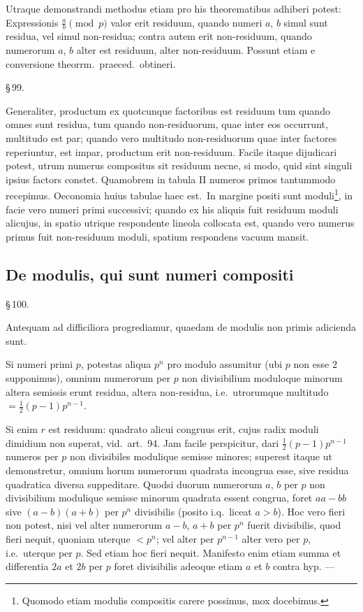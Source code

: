\documentclass[12pt,a4paper]{article}
\theoremstyle{plain}
\theoremstyle{definition}
\theoremstyle{remark}
\begin{document}
Utraque demonstrandi methodus etiam pro his theorematibus adhiberi potest: Expressionis $\frac{a}{b} \pmod{p}$ valor erit residuum, quando numeri $a$, $b$ simul sunt residua, vel simul non-residua; contra autem erit non-residuum, quando numerorum $a$, $b$ alter est residuum, alter non-residuum. Possunt etiam e conversione theorrm.\ praeced.\ obtineri.

\begin{center}\S\,99.\end{center}

Generaliter, productum ex quotcunque factoribus est residuum tum quando omnes sunt residua, tum quando non-residuorum, quae inter eos occurrunt, multitudo est par; quando vero multitudo non-residuorum quae inter factores reperiuntur, est impar, productum erit non-residuum. Facile itaque dijudicari potest, utrum numerus compositus sit residuum necne, si modo, quid sint singuli ipsius factors constet. Quamobrem in tabula II numeros primos tantummodo recepimus. Oeconomia huius tabulae haec est.\ In margine positi sunt moduli\footnote{Quomodo etiam modulis compositis carere possimus, mox docebimus.}, in facie vero numeri primi successivi; quando ex his aliquis fuit residuum moduli alicujus, in spatio utrique respondente lineola collocata est, quando vero numerus primus fuit non-residuum moduli, spatium respondens vacuum mansit.

\subsection*{De modulis, qui sunt numeri compositi}

\begin{center}\S\,100.\end{center}

Antequam ad difficiliora progrediamur, quaedam de modulis non primis adicienda sunt.

Si numeri primi $p$, potestas aliqua $p^n$ pro modulo assumitur (ubi $p$ non esse $2$ supponimus), omnium numerorum per $p$ non divisibilium moduloque minorum altera semissis erunt residua, altera non-residua, i.e.\ utrorumque multitudo $= \frac{1}{2}(p-1)p^{n-1}$.

Si enim $r$ est residuum: quadrato alicui congruus erit, cujus radix moduli dimidium non superat, vid.\ art.~94. Jam facile perspicitur, dari $\frac{1}{2}(p-1)p^{n-1}$ numeros per $p$ non divisibiles modulique semisse minores; superest itaque ut demonstretur, omnium horum numerorum quadrata incongrua esse, sive residua quadratica diversa suppeditare. Quodsi duorum numerorum $a$, $b$ per $p$ non divisibilium modulique semisse minorum quadrata essent congrua, foret $aa - bb$ sive $(a-b)(a+b)$ per $p^n$ divisibilis (posito i.q.\ liceat $a > b$). Hoc vero fieri non potest, nisi vel alter numerorum $a-b$, $a+b$ per $p^n$ fuerit divisibilis, quod fieri nequit, quoniam uterque $< p^n$; vel alter per $p^{n-1}$ alter vero per $p$, i.e.\ uterque per $p$. Sed etiam hoc fieri nequit. Manifesto enim etiam summa et differentia $2a$ et $2b$ per $p$ foret divisibilis adeoque etiam $a$ et $b$ contra hyp. ---
\end{document}
